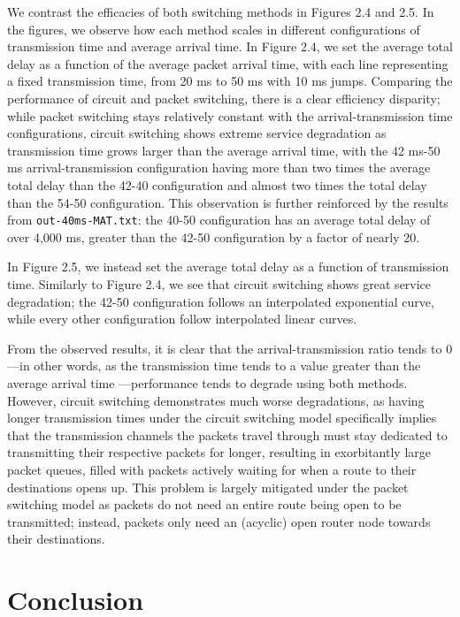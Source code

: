\documentclass{article}
\begin{document}
  We contrast the efficacies of both switching methods in Figures 2.4 and 2.5. In the figures, we
  observe how each method scales in different configurations of transmission time and average
  arrival time. In Figure 2.4, we set the average total delay as a function of the average packet
  arrival time, with each line representing a fixed transmission time, from 20 ms to 50 ms with 10 ms jumps. Comparing the performance of circuit and packet switching, there is a clear efficiency
  disparity; while packet switching stays relatively constant with the arrival-transmission
  time configurations, circuit switching shows extreme service degradation as transmission time
  grows larger than the average arrival time, with the 42 ms-50 ms arrival-transmission
  configuration having more than two times the average total delay than the 42-40 configuration
  and almost two times the total delay than the 54-50 configuration. This observation is further
  reinforced by the results from \verb|out-40ms-MAT.txt|: the 40-50 configuration has an average
  total delay of over 4,000 ms, greater than the 42-50 configuration by a factor of nearly 20.

  In Figure 2.5, we instead set the average total delay as a function of transmission time.
  Similarly to Figure 2.4, we see that circuit switching shows great service degradation;
  the 42-50 configuration follows an interpolated exponential curve, while every other
  configuration follow interpolated linear curves.

  From the observed results, it is clear that the arrival-transmission ratio tends to 0---in
  other words, as the transmission time tends to a value greater than the average arrival time
  ---performance tends to degrade using both methods. However, circuit switching demonstrates much
  worse degradations, as having longer transmission times under the circuit switching model
  specifically implies that the transmission channels the packets travel through must stay
  dedicated to transmitting their respective packets for longer, resulting in exorbitantly large
  packet queues, filled with packets actively waiting for when a route to their destinations
  opens up. This problem is largely mitigated under the packet switching model as packets do not
  need an entire route being open to be transmitted; instead, packets only need an (acyclic) open
  router node towards their destinations.

  \section{Conclusion}
\end{document}
